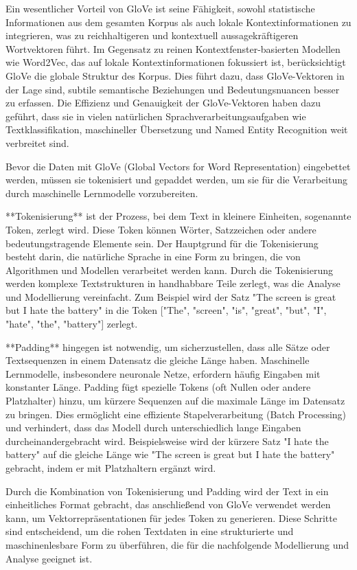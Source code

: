 \documentclass[12pt]{article}
\begin{document}
Ein wesentlicher Vorteil von GloVe ist seine Fähigkeit, sowohl statistische Informationen aus dem gesamten Korpus als auch lokale Kontextinformationen 
zu integrieren, was zu reichhaltigeren und kontextuell aussagekräftigeren Wortvektoren führt. Im Gegensatz zu reinen Kontextfenster-basierten Modellen 
wie Word2Vec, das auf lokale Kontextinformationen fokussiert ist, berücksichtigt GloVe die globale Struktur des Korpus. Dies führt dazu, dass 
GloVe-Vektoren in der Lage sind, subtile semantische Beziehungen und Bedeutungsnuancen besser zu erfassen. Die Effizienz und Genauigkeit der 
GloVe-Vektoren haben dazu geführt, dass sie in vielen natürlichen Sprachverarbeitungsaufgaben wie Textklassifikation, maschineller Übersetzung und 
Named Entity Recognition weit verbreitet sind.

Bevor die Daten mit GloVe (Global Vectors for Word Representation) eingebettet werden, müssen sie tokenisiert und gepaddet werden, um sie für die Verarbeitung durch maschinelle Lernmodelle vorzubereiten. 

**Tokenisierung** ist der Prozess, bei dem Text in kleinere Einheiten, sogenannte Token, zerlegt wird. Diese Token können Wörter, Satzzeichen oder andere bedeutungstragende Elemente sein. Der Hauptgrund für die Tokenisierung besteht darin, die natürliche Sprache in eine Form zu bringen, die von Algorithmen und Modellen verarbeitet werden kann. Durch die Tokenisierung werden komplexe Textstrukturen in handhabbare Teile zerlegt, was die Analyse und Modellierung vereinfacht. Zum Beispiel wird der Satz "The screen is great but I hate the battery" in die Token ["The", "screen", "is", "great", "but", "I", "hate", "the", "battery"] zerlegt.

**Padding** hingegen ist notwendig, um sicherzustellen, dass alle Sätze oder Textsequenzen in einem Datensatz die gleiche Länge haben. Maschinelle Lernmodelle, insbesondere neuronale Netze, erfordern häufig Eingaben mit konstanter Länge. Padding fügt spezielle Tokens (oft Nullen oder andere Platzhalter) hinzu, um kürzere Sequenzen auf die maximale Länge im Datensatz zu bringen. Dies ermöglicht eine effiziente Stapelverarbeitung (Batch Processing) und verhindert, dass das Modell durch unterschiedlich lange Eingaben durcheinandergebracht wird. Beispielsweise wird der kürzere Satz "I hate the battery" auf die gleiche Länge wie "The screen is great but I hate the battery" gebracht, indem er mit Platzhaltern ergänzt wird.

Durch die Kombination von Tokenisierung und Padding wird der Text in ein einheitliches Format gebracht, das anschließend von GloVe verwendet werden kann, um Vektorrepräsentationen für jedes Token zu generieren. Diese Schritte sind entscheidend, um die rohen Textdaten in eine strukturierte und maschinenlesbare Form zu überführen, die für die nachfolgende Modellierung und Analyse geeignet ist.
\end{document}
